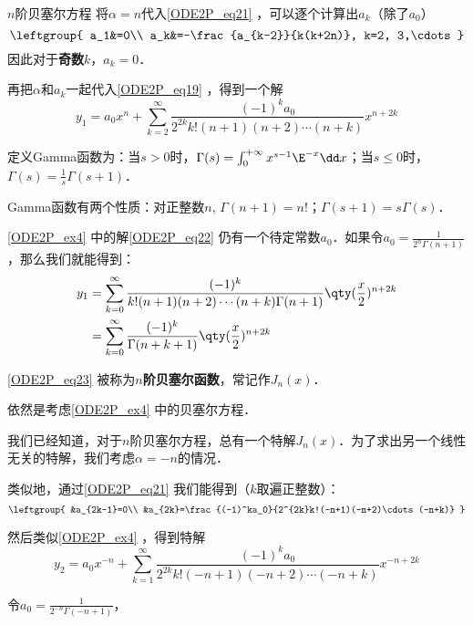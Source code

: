 \begin{example}{$n$阶贝塞尔方程}
将$\alpha=n$代入\autoref{ODE2P_eq21} ，可以逐个计算出$a_k$（除了$a_0$）
\begin{equation}
\leftgroup{
    a_1&=0\\
    a_k&=-\frac{a_{k-2}}{k(k+2n)}, k=2, 3,\cdots
}
\end{equation}
因此对于\textbf{奇数}$k$，$a_k=0$．

再把$\alpha$和$a_k$一起代入\autoref{ODE2P_eq19} ，得到一个解
\begin{equation}\label{ODE2P_eq22}
y_1=a_0x^n+\sum\limits^\infty_{k=2}\frac{(-1)^ka_0}{2^{2k}k!(n+1)(n+2)\cdots(n+k)}x^{n+2k}
\end{equation}


定义Gamma函数为：当$s>0$时，$\Gamma(s)=\int_0^{+\infty}x^{s-1}\E^{-x}\dd x$；当$s\leq 0$时，$\Gamma(s)=\frac{1}{s}\Gamma(s+1)$．

Gamma函数有两个性质：对正整数$n$, $\Gamma(n+1)=n!$；$\Gamma(s+1)=s\Gamma(s)$．

\autoref{ODE2P_ex4}  中的解\autoref{ODE2P_eq22} 仍有一个待定常数$a_0$．如果令$a_0=\frac{1}{2^n\Gamma(n+1)}$，那么我们就能得到：
\begin{equation}\label{ODE2P_eq23}
\begin{aligned}
y_1&=\sum\limits^\infty_{k=0}\frac{(-1)^k}{k!(n+1)(n+2)\cdots(n+k)\Gamma(n+1)}\qty(\frac{x}{2})^{n+2k}\\
 &=\sum\limits^\infty_{k=0}\frac{(-1)^k}{\Gamma(n+k+1)}\qty(\frac{x}{2})^{n+2k}
\end{aligned}
\end{equation}

\autoref{ODE2P_eq23} 被称为\textbf{$n$阶贝塞尔函数}，常记作$J_n(x)$．


\end{example}



\begin{example}{}
依然是考虑\autoref{ODE2P_ex4} 中的贝塞尔方程．

我们已经知道，对于$n$阶贝塞尔方程，总有一个特解$J_n(x)$．为了求出另一个线性无关的特解，我们考虑$\alpha=-n$的情况．

类似地，通过\autoref{ODE2P_eq21} 我们能得到（$k$取遍正整数）：
\begin{equation}
\leftgroup{
    &a_{2k-1}=0\\
    &a_{2k}=\frac{(-1)^ka_0}{2^{2k}k!(-n+1)(-n+2)\cdots(-n+k)}
}
\end{equation}

然后类似\autoref{ODE2P_ex4} ，得到特解
\begin{equation}
y_2=a_0x^{-n}+\sum\limits^\infty_{k=1}\frac{(-1)^ka_0}{2^{2k}k!(-n+1)(-n+2)\cdots(-n+k)}x^{-n+2k}
\end{equation}

令$a_0=\frac{1}{2^{-n}\Gamma(-n+1)}$，



\end{example}










